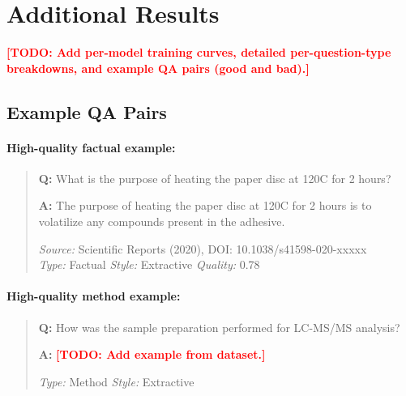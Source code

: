\documentclass[11pt]{article}
\newcommand{\todo}[1]{\textcolor{red}{\textbf{[TODO: #1]}}}
\begin{document}
\section{Additional Results}
\label{app:additional_results}

\todo{Add per-model training curves, detailed per-question-type breakdowns, and example QA pairs (good and bad).}

\subsection{Example QA Pairs}

\paragraph{High-quality factual example:}

\begin{quote}
\textbf{Q:} What is the purpose of heating the paper disc at 120\textdegree{}C for 2 hours?

\textbf{A:} The purpose of heating the paper disc at 120\textdegree{}C for 2 hours is to volatilize any compounds present in the adhesive.

\textit{Source:} Scientific Reports (2020), DOI: 10.1038/s41598-020-xxxxx \\
\textit{Type:} Factual \quad \textit{Style:} Extractive \quad \textit{Quality:} 0.78
\end{quote}

\paragraph{High-quality method example:}

\begin{quote}
\textbf{Q:} How was the sample preparation performed for LC-MS/MS analysis?

\textbf{A:} \todo{Add example from dataset.}

\textit{Type:} Method \quad \textit{Style:} Extractive
\end{quote}
\end{document}

